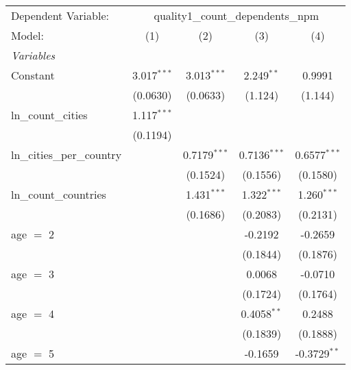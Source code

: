 \begingroup
\centering
\begin{tabular}{lcccc}
   \tabularnewline \midrule \midrule
   Dependent Variable: & \multicolumn{4}{c}{quality1\_count\_dependents\_npm}\\
   Model:                               & (1)           & (2)            & (3)            & (4)\\  
   \midrule
   \emph{Variables}\\
   Constant                             & 3.017$^{***}$ & 3.013$^{***}$  & 2.249$^{**}$   & 0.9991\\   
                                        & (0.0630)      & (0.0633)       & (1.124)        & (1.144)\\   
   ln\_count\_cities                    & 1.117$^{***}$ &                &                &   \\   
                                        & (0.1194)      &                &                &   \\   
   ln\_cities\_per\_country             &               & 0.7179$^{***}$ & 0.7136$^{***}$ & 0.6577$^{***}$\\   
                                        &               & (0.1524)       & (0.1556)       & (0.1580)\\   
   ln\_count\_countries                 &               & 1.431$^{***}$  & 1.322$^{***}$  & 1.260$^{***}$\\   
                                        &               & (0.1686)       & (0.2083)       & (0.2131)\\   
   age $=$ 2                            &               &                & -0.2192        & -0.2659\\   
                                        &               &                & (0.1844)       & (0.1876)\\   
   age $=$ 3                            &               &                & 0.0068         & -0.0710\\   
                                        &               &                & (0.1724)       & (0.1764)\\   
   age $=$ 4                            &               &                & 0.4058$^{**}$  & 0.2488\\   
                                        &               &                & (0.1839)       & (0.1888)\\   
   age $=$ 5                            &               &                & -0.1659        & -0.3729$^{**}$\\   

\end{tabular}
